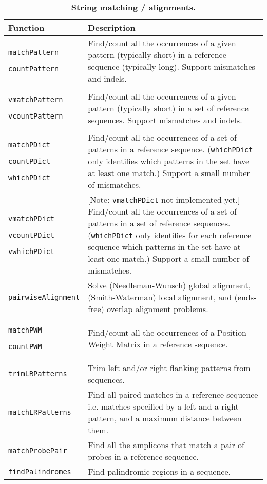 \documentclass[10pt]{article}
\newcommand{\Rfunction}[1]{\texttt{#1}}
\begin{document}
\begin{table}[ht]
\begin{center}
\begin{tabular}{p{2.5in}|p{4in}}
{\bf Function} & {\bf Description} \\
\hline
\Rfunction{matchPattern}\par
\Rfunction{countPattern} &
    Find/count all the occurrences of a given pattern (typically short)
    in a reference sequence (typically long).
    Support mismatches and indels. \\
\hline
\Rfunction{vmatchPattern}\par
\Rfunction{vcountPattern} &
    Find/count all the occurrences of a given pattern (typically short)
    in a set of reference sequences.
    Support mismatches and indels. \\
\hline
\Rfunction{matchPDict}\par
\Rfunction{countPDict}\par
\Rfunction{whichPDict} &
    Find/count all the occurrences of a set of patterns in a reference
    sequence. (\Rfunction{whichPDict} only identifies which patterns in
    the set have at least one match.)
    Support a small number of mismatches. \\
\hline
\Rfunction{vmatchPDict}\par
\Rfunction{vcountPDict}\par
\Rfunction{vwhichPDict} &
    [Note: \Rfunction{vmatchPDict} not implemented yet.]
    Find/count all the occurrences of a set of patterns in a set of
    reference sequences. (\Rfunction{whichPDict} only identifies for each
    reference sequence which patterns in the set have at least one match.)
    Support a small number of mismatches. \\
\hline
\Rfunction{pairwiseAlignment} &
    Solve (Needleman-Wunsch) global alignment, (Smith-Waterman) local
    alignment, and (ends-free) overlap alignment problems. \\
\hline
\Rfunction{matchPWM}\par
\Rfunction{countPWM} &
    Find/count all the occurrences of a Position Weight Matrix in a reference
    sequence. \\
\hline
\Rfunction{trimLRPatterns} &
    Trim left and/or right flanking patterns from sequences. \\
\hline
\Rfunction{matchLRPatterns} &
    Find all paired matches in a reference sequence i.e. matches specified by
    a left and a right pattern, and a maximum distance between them. \\
\hline
\Rfunction{matchProbePair} &
    Find all the amplicons that match a pair of probes in a reference
    sequence. \\
\hline
\Rfunction{findPalindromes} &
    Find palindromic regions in a sequence. \\
\hline
\end{tabular}
\end{center}
\caption{\bf String matching / alignments.}
\label{table:String_matching_alignments}
\end{table}
\end{document}
